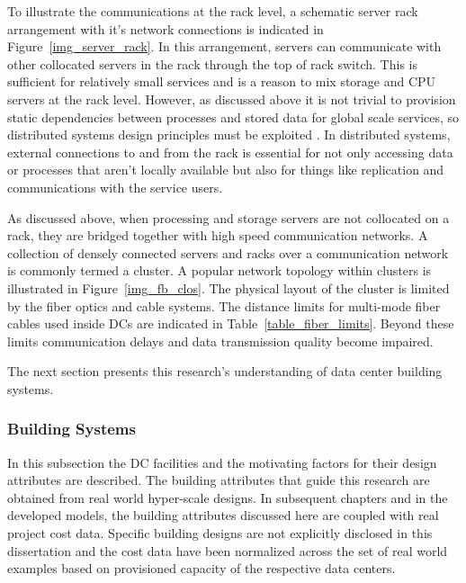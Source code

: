         To illustrate the communications at the rack level, a schematic server rack arrangement with it's network connections is indicated in Figure~\ref{img_server_rack}. In this arrangement, servers can communicate with other collocated servers in the rack through the top of rack switch. This is sufficient for relatively small services and is a reason to mix storage and CPU servers at the rack level. However, as discussed above it is not trivial to provision static dependencies between processes and stored data for global scale services, so distributed systems design principles must be exploited \cite{tanenbaum}. In distributed systems, external connections to and from the rack is essential for not only accessing data or processes that aren't locally available but also for things like replication and communications with the service users. 
    
        
        
        As discussed above, when processing and storage servers are not collocated on a rack, they are bridged together with high speed communication networks. A collection of densely connected servers and racks over a communication network is commonly termed a cluster. A popular network topology within clusters is illustrated in Figure~\ref{img_fb_clos}. The physical layout of the cluster is limited by the fiber optics and cable systems. The distance limits for multi-mode fiber cables used inside DCs are indicated in Table~\ref{table_fiber_limits}. Beyond these limits communication delays and data transmission quality become impaired. 
        
        
        
        
        
        The next section presents this research's understanding of data center building systems.
        
        \subsubsection{Building Systems}
        
        In this subsection the DC facilities and the motivating factors for their design attributes are described. The building attributes that guide this research are obtained from real world hyper-scale designs. In subsequent chapters and in the developed models, the building attributes discussed here are coupled with real project cost data. Specific building designs are not explicitly disclosed in this dissertation and the cost data have been normalized across the set of real world examples based on provisioned capacity of the respective data centers. 
        

